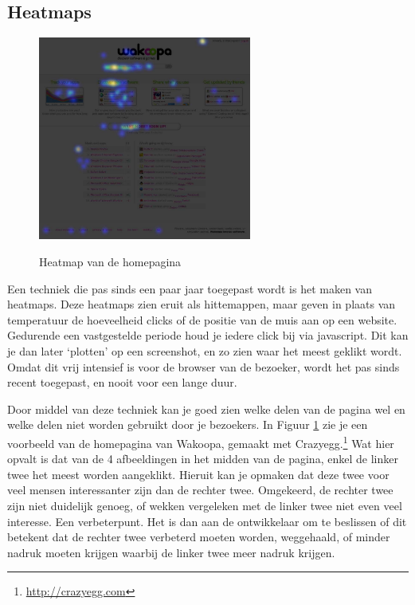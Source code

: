 \documentclass[a4paper, 10pt, pdftex]{report}
\begin{document}
    \subsection{Heatmaps}
      \begin{figure}
      \begin{center}
      \caption{Heatmap van de homepagina}
        \includegraphics[width=70mm]{../images/heatmap}
      \label{heatmap}
      \end{center}
    \end{figure}
    Een techniek die pas sinds een paar jaar toegepast wordt is het maken van heatmaps. Deze heatmaps zien eruit als hittemappen, maar geven in plaats van temperatuur de hoeveelheid clicks of de positie van de muis aan op een website. Gedurende een vastgestelde periode houd je iedere click bij via javascript. Dit kan je dan later `plotten' op een screenshot, en zo zien waar het meest geklikt wordt. Omdat dit vrij intensief is voor de browser van de bezoeker, wordt het pas sinds recent toegepast, en nooit voor een lange duur.

    Door middel van deze techniek kan je goed zien welke delen van de pagina wel en welke delen niet worden gebruikt door je bezoekers. In Figuur \ref{heatmap} zie je een voorbeeld van de homepagina van Wakoopa, gemaakt met Crazyegg.\footnote{\url{http://crazyegg.com}} Wat hier opvalt is dat van de 4 afbeeldingen in het midden van de pagina, enkel de linker twee het meest worden aangeklikt. Hieruit kan je opmaken dat deze twee voor veel mensen interessanter zijn dan de rechter twee. Omgekeerd, de rechter twee zijn niet duidelijk genoeg, of wekken vergeleken met de linker twee niet even veel interesse. Een verbeterpunt. Het is dan aan de ontwikkelaar om te beslissen of dit betekent dat de rechter twee verbeterd moeten worden, weggehaald, of minder nadruk moeten krijgen waarbij de linker twee meer nadruk krijgen.
\end{document}

